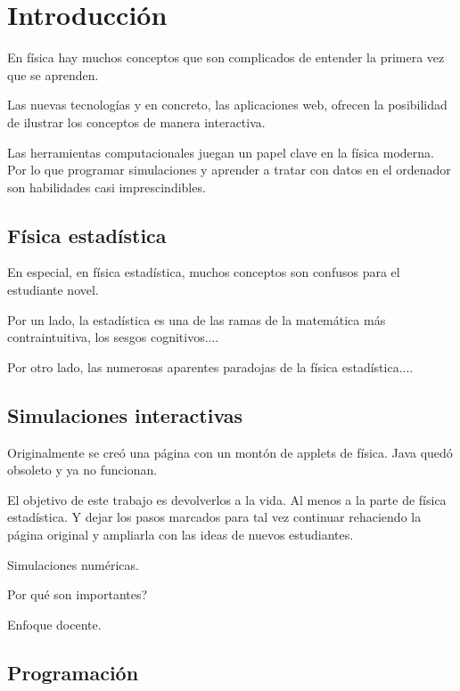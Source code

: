 \documentclass[11pt, a4paper]{article} %
\theoremstyle{named}
\begin{document}
\tableofcontents

\newpage
\section{Introducción}
\label{sec:intro}

    En física hay muchos conceptos que son complicados de entender la primera vez que se aprenden.

    Las nuevas tecnologías y en concreto, las aplicaciones web, ofrecen la posibilidad de ilustrar los conceptos de manera interactiva.

    Las herramientas computacionales juegan un papel clave en la física moderna. Por lo que programar simulaciones y aprender a tratar con datos en el ordenador son habilidades casi imprescindibles.

\subsection{Física estadística}\label{sec:fises}

    En especial, en física estadística, muchos conceptos son confusos para el estudiante novel.

    Por un lado, la estadística es una de las ramas de la matemática más contraintuitiva, los sesgos cognitivos....

    Por otro lado, las numerosas aparentes paradojas de la física estadística....

    \subsection{Simulaciones interactivas}
    \label{sec:sims}

        Originalmente se creó una página con un montón de applets de física. Java quedó obsoleto y ya no funcionan.

        El objetivo de este trabajo es devolverlos a la vida. Al menos a la parte de física estadística. Y dejar los pasos marcados para tal vez continuar rehaciendo la página original y ampliarla con las ideas de nuevos estudiantes.

        Simulaciones numéricas.

        Por qué son importantes?

        Enfoque docente.

    \subsection{Programación}
    \label{sec:code}
\end{document}
